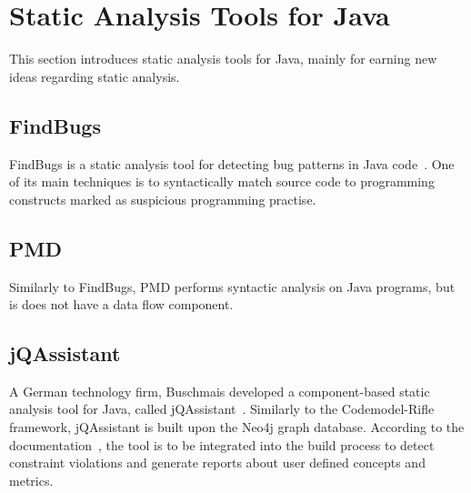 \section{Static Analysis Tools for Java}

This section introduces static analysis tools for Java, mainly for earning new ideas regarding static analysis.


\subsection{FindBugs}

FindBugs is a static analysis tool for detecting bug patterns in Java code~\cite{findbugs-website}. One of its main techniques is to syntactically match source code to programming constructs marked as suspicious programming practise. ~\cite{rutar2004comparison}


\subsection{PMD}

Similarly to FindBugs, PMD performs syntactic analysis on Java programs, but is does not have a data flow component. ~\cite{rutar2004comparison}


\subsection{jQAssistant}

A German technology firm, Buschmais developed a component-based static analysis tool for Java, called jQAssistant~\cite{jqassistant-website}. Similarly to the Codemodel-Rifle framework, jQAssistant is built upon the Neo4j graph database. According to the documentation~\cite{jqassistant-documentation}, the tool is to be integrated into the build process to detect constraint violations and generate reports about user defined concepts and metrics.

